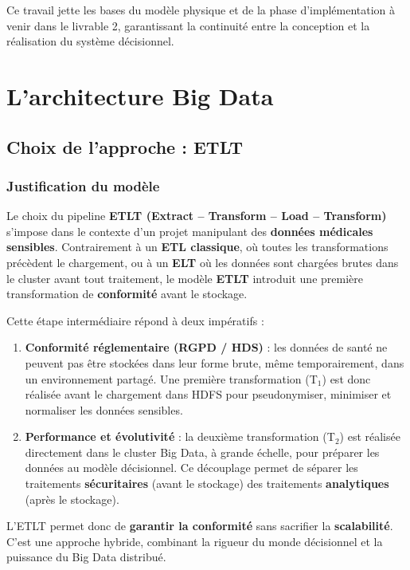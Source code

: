 \documentclass[12pt,a4paper]{article}
\begin{document}
Ce travail jette les bases du modèle physique et de la phase d'implémentation à venir dans le livrable 2, garantissant la continuité entre la conception et la réalisation du système décisionnel.

\newpage
\section{L'architecture Big Data}

\subsection{Choix de l'approche : ETLT}

\subsubsection{Justification du modèle}

Le choix du pipeline \textbf{ETLT (Extract – Transform – Load – Transform)} s'impose dans le contexte d'un projet manipulant des \textbf{données médicales sensibles}.
Contrairement à un \textbf{ETL classique}, où toutes les transformations précèdent le chargement, ou à un \textbf{ELT} où les données sont chargées brutes dans le cluster avant tout traitement, le modèle \textbf{ETLT} introduit une première transformation de \textbf{conformité} avant le stockage.

Cette étape intermédiaire répond à deux impératifs :

\begin{enumerate}[leftmargin=*]
    \item \textbf{Conformité réglementaire (RGPD / HDS)} : les données de santé ne peuvent pas être stockées dans leur forme brute, même temporairement, dans un environnement partagé. Une première transformation (T$_{1}$) est donc réalisée avant le chargement dans HDFS pour pseudonymiser, minimiser et normaliser les données sensibles.
    
    \item \textbf{Performance et évolutivité} : la deuxième transformation (T$_{2}$) est réalisée directement dans le cluster Big Data, à grande échelle, pour préparer les données au modèle décisionnel. Ce découplage permet de séparer les traitements \textbf{sécuritaires} (avant le stockage) des traitements \textbf{analytiques} (après le stockage).
\end{enumerate}
L'ETLT permet donc de \textbf{garantir la conformité} sans sacrifier la \textbf{scalabilité}.
C'est une approche hybride, combinant la rigueur du monde décisionnel et la puissance du Big Data distribué.
\end{document}
